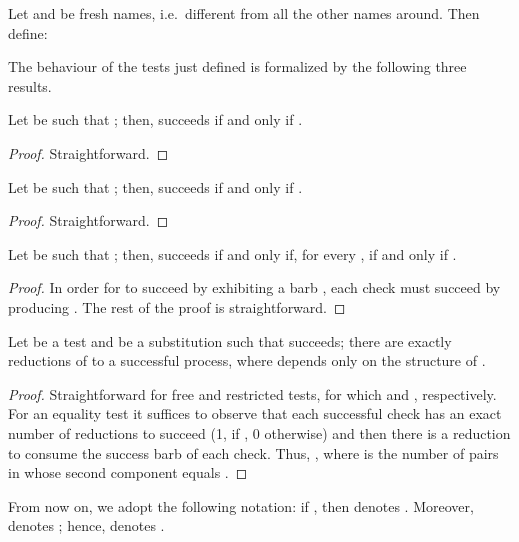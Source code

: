 \documentclass{LMCS}
\begin{document}
\begin{defi}[Tests]
Let  and  be fresh names, i.e.\ different from all the other names around. Then define:

\end{defi}

The behaviour of the tests just defined is formalized by the following three results.

\begin{lem}
\label{lem:free-succ}
Let  be such that ; then,
 succeeds if and only if .
\end{lem}
\begin{proof}
Straightforward.
\end{proof}

\begin{lem}
\label{lem:rest-succ}
Let  be such that ; then,
 succeeds if and only if .
\end{lem}
\begin{proof}
Straightforward.
\end{proof}

\begin{lem}
\label{lem:equi-succ}
Let  be such that ; then,
 succeeds if and only if, for every , 
 if and only if .
\end{lem}
\begin{proof}
In order for  to succeed by exhibiting a barb , 
each check  must succeed by producing .
The rest of the proof is straightforward.
\end{proof}

\begin{lem}
\label{lem:exact-reduct-tests}
Let  be a test and  be a substitution such that  succeeds; 
there are exactly  reductions of  to a successful process, where  depends only on the structure of .
\end{lem}
\begin{proof}
Straightforward for free and restricted tests, for which  and , respectively. 
For an equality test  it suffices to observe that each successful check has an exact 
number of reductions to succeed (1, if , 0 otherwise) and then there is a reduction to consume the success 
barb of each check.
Thus, , where  is the number of pairs in  whose second component equals .
\end{proof}

From now on, we adopt the following notation: if , then 
denotes . Moreover,  denotes
; hence,  denotes
.
\end{document}
